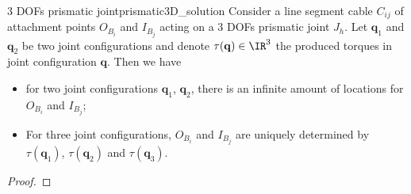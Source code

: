 \begin{theorembox}{3 DOFs prismatic joint}{prismatic3D_solution}
    Consider a line segment cable $C_{ij}$ of attachment points $O_{B_i}$ and $I_{B_j}$ acting on a 3 DOFs prismatic joint $J_h$. Let $\mathbf{q}_1$ and $\mathbf{q}_2$ be two joint configurations and denote $\tau(\mathbf{q})\in\IR^3$ the produced torques in joint configuration $\mathbf{q}$. Then we have

    \begin{itemize}
        \item {for two joint configurations $\mathbf{q}_1$, $\mathbf{q}_2$, there is an infinite amount of locations for $O_{B_i}$ and $I_{B_j}$;}
        \item {For three joint configurations, $O_{B_i}$ and $I_{B_j}$ are uniquely determined by $\tau(\mathbf{q}_1)$, $\tau(\mathbf{q}_2)$ and $\tau(\mathbf{q}_3)$.}
    \end{itemize}
\end{theorembox}
\begin{proof}
    
\end{proof}


